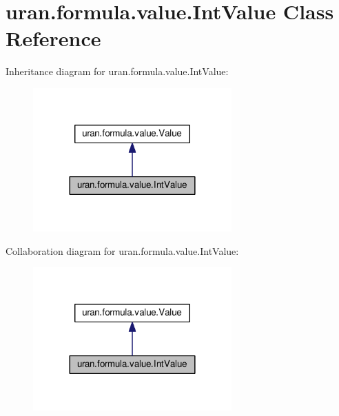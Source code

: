 \hypertarget{classuran_1_1formula_1_1value_1_1_int_value}{}\section{uran.\+formula.\+value.\+Int\+Value Class Reference}
\label{classuran_1_1formula_1_1value_1_1_int_value}


Inheritance diagram for uran.\+formula.\+value.\+Int\+Value\+:
\nopagebreak
\begin{figure}[H]
\begin{center}
\leavevmode
\includegraphics[width=216pt]{classuran_1_1formula_1_1value_1_1_int_value__inherit__graph}
\end{center}
\end{figure}


Collaboration diagram for uran.\+formula.\+value.\+Int\+Value\+:
\nopagebreak
\begin{figure}[H]
\begin{center}
\leavevmode
\includegraphics[width=216pt]{classuran_1_1formula_1_1value_1_1_int_value__coll__graph}
\end{center}
\end{figure}
